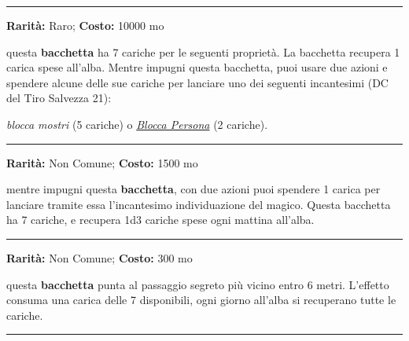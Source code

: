 \begin{multicols}{2}
\smallskip\noindent\rule{\linewidth}{2pt}  \hypertarget{BacchettadelVincolo}{}\medskip{}\noindent\label{BacchettadelVincolo}

\textbf{Rarità:} Raro; \textbf{Costo:} 10000 mo

questa \textbf{bacchetta} ha 7 cariche per le seguenti proprietà. La bacchetta recupera 1 carica spese all'alba. Mentre impugni questa bacchetta, puoi usare due azioni e spendere alcune delle sue cariche per lanciare uno dei seguenti incantesimi (DC del Tiro Salvezza 21):

\emph{blocca mostri} (5 cariche) o \emph{\hyperlink{Blocca Persona}{Blocca Persona}} (2 cariche).

\smallskip\noindent\rule{\linewidth}{2pt}  \hypertarget{Bacchettadell'IndividuazionedelMagico}{}\medskip{}\noindent\label{Bacchettadell'IndividuazionedelMagico}

\textbf{Rarità:} Non Comune; \textbf{Costo:} 1500 mo

mentre impugni questa \textbf{bacchetta}, con due azioni puoi spendere 1 carica per lanciare tramite essa l'incantesimo individuazione del magico. Questa bacchetta ha 7 cariche, e recupera 1d3 cariche spese ogni mattina all'alba.

\smallskip\noindent\rule{\linewidth}{2pt}  \hypertarget{Bacchettadell'Individuazionedelleportesegrete}{}\medskip{}\noindent\label{Bacchettadell'Individuazionedelleportesegrete}

\textbf{Rarità:} Non Comune; \textbf{Costo:} 300 mo

questa \textbf{bacchetta} punta al passaggio segreto più vicino entro 6 metri. L'effetto consuma una carica delle 7 disponibili, ogni giorno all'alba si recuperano tutte le cariche.

\smallskip\noindent\rule{\linewidth}{2pt}  \hypertarget{BacchettadellaFugaAssistita}{}\medskip{}\noindent\label{BacchettadellaFugaAssistita}


\end{multicols}
